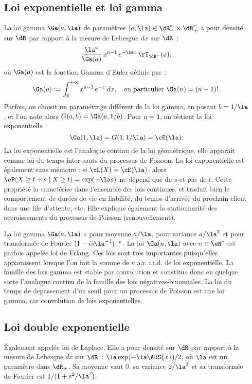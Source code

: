 %
\subsection{Loi exponentielle et loi gamma}\label{ss:loi:gamma}
%

La loi gamma $\Ga(a,\la)$ de paramètres $(a,\la)\in\dR_+^*\times\dR_+^*$ a pour
densité sur $\dR$ par rapport à la mesure de Lebesgue $dx$ sur $\dR$~:
$$
\frac{\la^a}{\Ga(a)}\,x^{a-1}\,e^{-\la x}\,\rI_{\dR^+}(x),
$$
où $\Ga(a)$ est la fonction Gamma d'Euler définie par~:
$$
\Ga(a):=\int_0^{+\infty}\!x^{a-1}\,e^{-x}\,dx, \text{\quad en particulier }\Ga(n)=(n-1)!. 
$$
Parfois, on choisit un paramétrage différent de la loi gamma, en posant
$b=1/\la$, et l'on note alors $G(a,b)=\Ga(a,1/b)$. Pour $a=1$, on obtient la
loi exponentielle :
$$
\Ga(1,\la)=G(1,1/\la)=\cE(\la).
$$
La loi exponentielle est l'analogue continu de la loi géométrique, elle
apparaît comme loi du temps inter-sauts du processus de Poisson. La loi
exponentielle est également sans mémoire : si $\cL(X)=\cE(\la)$, alors $\eP(X
\geq t+s\;\vert\;X\geq t)=\exp(-\la s)$ ne dépend que de $s$ et pas de $t$. Cette
propriété la caractérise dans l'ensemble des lois continues, et traduit bien
le comportement de durées de vie en fiabilité, du temps d'arrivée du prochain
client dans une file d'attente, etc. Elle explique également la stationnarité
des accroissements du processus de Poisson (renouvellement).

La loi gamma $\Ga(a,\la)$ a pour moyenne $a/\la$, pour variance $a/\la^2$ et
pour transformée de Fourier $(1-is\la^{-1})^{-a}$. La loi $\Ga(n,\la)$ avec
$n\in\eN^*$ est parfois appelée loi de Erlang. Ces lois sont très importantes
puisqu'elles apparaissent lorsque l'on fait la somme de v.a.r. i.i.d. de loi
exponentielle. La famille des lois gamma est stable par convolution et
constitue donc en quelque sorte l'analogue continu de la famille des lois
négatives-binomiales.  La loi du temps de depassement d'un seuil pour un
processus de Poisson est une loi gamma, car convolution de lois exponentielles.

%
\subsection{Loi double exponentielle}\label{ss:loi:laplace}
%

Également appelée loi de Laplace. Elle a pour densité sur $\dR$ par rapport à
la mesure de Lebesgue $dx$ sur $\dR$~: $\la\exp(-\la\ABS{x})/2$, où $\la$ est
un paramètre dans $\dR_+$. Sa moyenne vaut $0$, sa variance $2/\la^2$ et sa
transformée de Fourier est $1/(1+s^2/\la^2)$.

